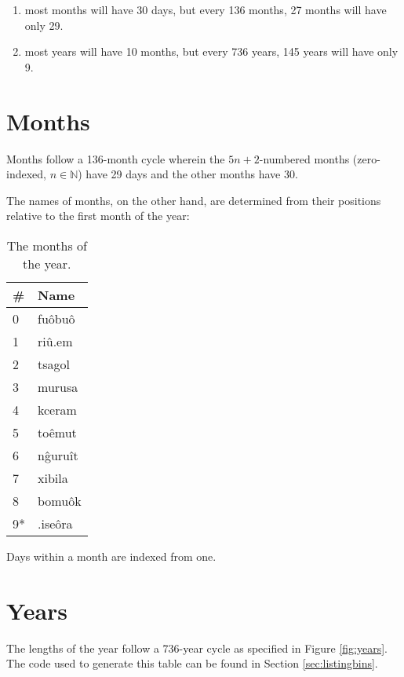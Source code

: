 \documentclass{book}
\begin{document}
\begin{enumerate}
    \item most months will have 30 days, but every 136 months, 27 months will have only 29.
    \item most years will have 10 months, but every 736 years, 145 years will have only 9.
\end{enumerate}

\newpage

\section{Months}

Months follow a 136-month cycle wherein the $5n + 2$-numbered months (zero-indexed, $n \in \mathbb{N}$) have 29 days and the other months have 30.

The names of months, on the other hand, are determined from their positions relative to the first month of the year:

\begin{table}[ht]
    \caption{The months of the year.}
    \centering
    \begin{tabular}{|l|>{\kardinal}l|}
        \hline
        \# & \textnormal{Name} \\
        \hline
        0 & fu\^obu\^o \\
        1 & ri\^u.em \\
        2 & tsagol \\
        3 & murusa \\
        4 & kceram \\
        5 & to\^emut \\
        6 & n\^guru\^it \\
        7 & xibila \\
        8 & bomu\^ok \\
        \hline
        9* & .ise\^ora \\
        \hline
    \end{tabular}
\end{table}

Days within a month are indexed from one.

\section{Years}

The lengths of the year follow a 736-year cycle as specified in Figure \ref{fig:years}.
The code used to generate this table can be found in Section \ref{sec:listingbins}.
\end{document}
